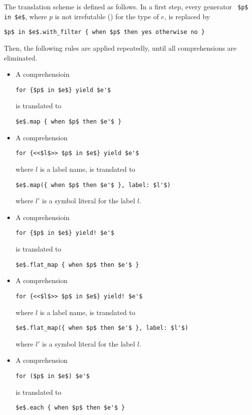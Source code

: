 The translation scheme is defined as follows. In a first step, every generator ~\lstinline!$p$ in $e$!, where $p$ is not irrefutable () for the type of $e$, is replaced by 
\begin{lstlisting}
$p$ in $e$.with_filter { when $p$ then yes otherwise no }
\end{lstlisting}

Then, the following rules are applied repeatedly, until all comprehensions are eliminated. 
\begin{itemize}

\item A comprehensioin 
\begin{lstlisting}
for {$p$ in $e$} yield $e'$
\end{lstlisting}
is translated to
\begin{lstlisting}
$e$.map { when $p$ then $e'$ }
\end{lstlisting}

\item A comprehension
\begin{lstlisting}
for {<<$l$>> $p$ in $e$} yield $e'$
\end{lstlisting}
where $l$ is a label name, is translated to
\begin{lstlisting}[deletekeywords={label}]
$e$.map({ when $p$ then $e'$ }, label: $l'$)
\end{lstlisting}
where $l'$ is a symbol literal for the label $l$. 

\item A comprehensioin 
\begin{lstlisting}
for {$p$ in $e$} yield! $e'$
\end{lstlisting}
is translated to
\begin{lstlisting}
$e$.flat_map { when $p$ then $e'$ }
\end{lstlisting}

\item A comprehension
\begin{lstlisting}
for {<<$l$>> $p$ in $e$} yield! $e'$
\end{lstlisting}
where $l$ is a label name, is translated to
\begin{lstlisting}[deletekeywords={label}]
$e$.flat_map({ when $p$ then $e'$ }, label: $l'$)
\end{lstlisting}
where $l'$ is a symbol literal for the label $l$. 


\item A comprehension 
\begin{lstlisting}
for ($p$ in $e$) $e'$
\end{lstlisting}
is translated to
\begin{lstlisting}
$e$.each { when $p$ then $e'$ }
\end{lstlisting}


\end{itemize}
